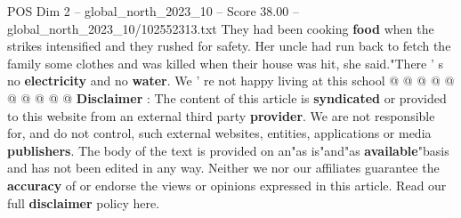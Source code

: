 \begin{textsample}{POS Dim 2 – global\_north\_2023\_10 – Score 38.00 – global\_north\_2023\_10/102552313.txt}
They had been cooking \textbf{food} when the strikes intensified and they rushed for safety.
Her uncle had run back to fetch the family some clothes and was killed when their house was hit, she said."There ' s no \textbf{electricity} and no \textbf{water}.
We ' re not happy living at this school @ @ @ @ @ @ @ @ @ @ \textbf{Disclaimer} : The content of this article is \textbf{syndicated} or provided to this website from an external third party \textbf{provider}.
We are not responsible for, and do not control, such external websites, entities, applications or media \textbf{publishers}.
The body of the text is provided on an"as is"and"as \textbf{available}"basis and has not been edited in any way.
Neither we nor our affiliates guarantee the \textbf{accuracy} of or endorse the views or opinions expressed in this article.
Read our full \textbf{disclaimer} policy here.

\end{textsample}

